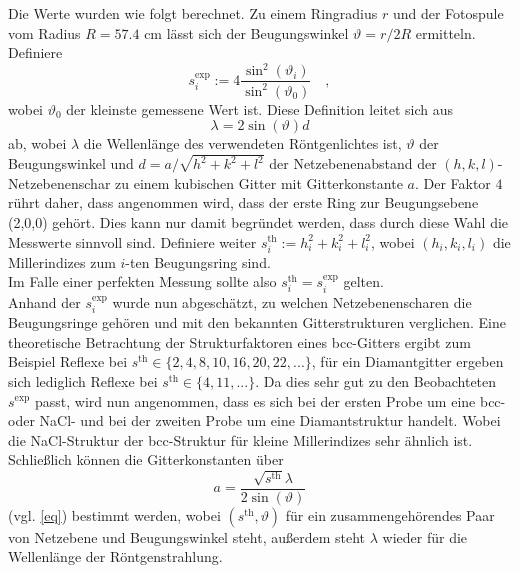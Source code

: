 Die Werte wurden wie folgt berechnet. Zu einem Ringradius $r$ und der Fotospule vom 
Radius $R=57.4 \text{ cm}$ lässt sich der Beugungswinkel $\vartheta=r/2R$ ermitteln. 
Definiere
\begin{equation}
s_i^\text{exp}:=4 \frac{\sin^2(\vartheta_i)}{\sin^2(\vartheta_0)} \quad ,
\end{equation}
wobei $\vartheta_0$ der kleinste gemessene Wert ist. Diese Definition leitet sich 
aus
\begin{equation}
\lambda=2\sin(\vartheta) d \label{eq}
\end{equation}
ab, wobei $\lambda$ die Wellenlänge des verwendeten Röntgenlichtes ist, $\vartheta$ der Beugungswinkel und $d=a/\sqrt{h^2+k^2+l^2}$ der Netzebenenabstand der $(h,k,l)$-
Netzebenenschar zu einem kubischen Gitter mit Gitterkonstante $a$. Der Faktor $4$ rührt daher, dass angenommen wird, dass der erste Ring zur 
Beugungsebene (2,0,0) gehört. Dies kann nur damit begründet werden, dass durch diese
Wahl die Messwerte sinnvoll sind. 
Definiere weiter $s^\text{th}_i:=h_i^2+k_i^2+l_i^2$, wobei $(h_i,k_i,l_i)$ die 
Millerindizes zum $i$-ten Beugungsring sind.\\
Im Falle einer perfekten Messung sollte also $s_i^\text{th}=s_i^\text{exp}$ gelten.
\\
Anhand der $s_i^\text{exp}$ wurde nun abgeschätzt, zu welchen Netzebenenscharen die 
Beugungsringe gehören und mit den bekannten Gitterstrukturen verglichen. Eine 
theoretische Betrachtung der Strukturfaktoren eines bcc-Gitters ergibt zum Beispiel 
Reflexe bei $s^\text{th} \in \{ 2,4,8,10,16,20,22,... \}$, für ein Diamantgitter 
ergeben sich lediglich Reflexe bei $s^\text{th}\in \{ 4,11,... \}$. Da dies sehr gut 
zu den Beobachteten $s^\text{exp}$ passt, wird nun angenommen, dass es sich bei der 
ersten Probe um eine bcc- oder NaCl- und bei der zweiten Probe um eine 
Diamantstruktur handelt. Wobei die NaCl-Struktur der bcc-Struktur für kleine 
Millerindizes sehr ähnlich ist.
\\
Schließlich können die Gitterkonstanten über
\begin{equation}
a=\frac{\sqrt{s^\text{th}} \lambda}{2 \sin(\vartheta)}
\end{equation}
(vgl. \eqref{eq}) bestimmt werden, wobei $(s^\text{th},\vartheta)$ für ein 
zusammengehörendes Paar von Netzebene und Beugungswinkel steht, außerdem steht 
$\lambda$ wieder für die Wellenlänge der Röntgenstrahlung.

